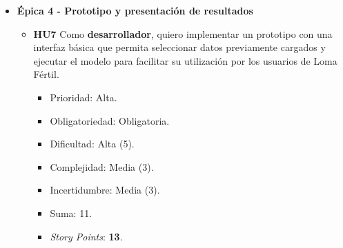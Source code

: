 \documentclass[
11pt, %
]{charter}
\begin{document}
\begin{itemize}
\begin{itemize}
      \item \textbf{HU5} Como \textbf{científico de datos}, quiero evaluar distintas alternativas de regresión para seleccionar el modelo que presente el desempeño más adecuado para el problema planteado.
        \begin{itemize}
          \item Prioridad: Alta.
          \item Obligatoriedad: Obligatoria.
          \item Dificultad: Alta (5).
          \item Complejidad: Alta (5).
          \item Incertidumbre: Alta (5).
          \item Suma: 15.
          \item \textit{Story Points}: \textbf{21}.
        \end{itemize}

      \item \textbf{HU6} Como \textbf{usuario final}, quiero disponer de información sobre el desempeño del modelo y sobre las variables relevantes de la estimación para interpretar adecuadamente los resultados obtenidos.
        \begin{itemize}
          \item Prioridad: Media.
          \item Obligatoriedad: Obligatoria.
          \item Dificultad: Media (3).
          \item Complejidad: Media (3).
          \item Incertidumbre: Baja (1).
          \item Suma: 7.
          \item \textit{Story Points}: \textbf{8}.
        \end{itemize}

    \end{itemize}


  \item \textbf{\'{E}pica 4 - Prototipo y presentación de resultados}
    \begin{itemize}

      \item \textbf{HU7} Como \textbf{desarrollador}, quiero implementar un prototipo con una interfaz básica que permita seleccionar datos previamente cargados y ejecutar el modelo para facilitar su utilización por los usuarios de Loma Fértil.
        \begin{itemize}
          \item Prioridad: Alta.
          \item Obligatoriedad: Obligatoria.
          \item Dificultad: Alta (5).
          \item Complejidad: Media (3).
          \item Incertidumbre: Media (3).
          \item Suma: 11.
          \item \textit{Story Points}: \textbf{13}.
        \end{itemize}


\end{itemize}
\end{itemize}
\end{document}
